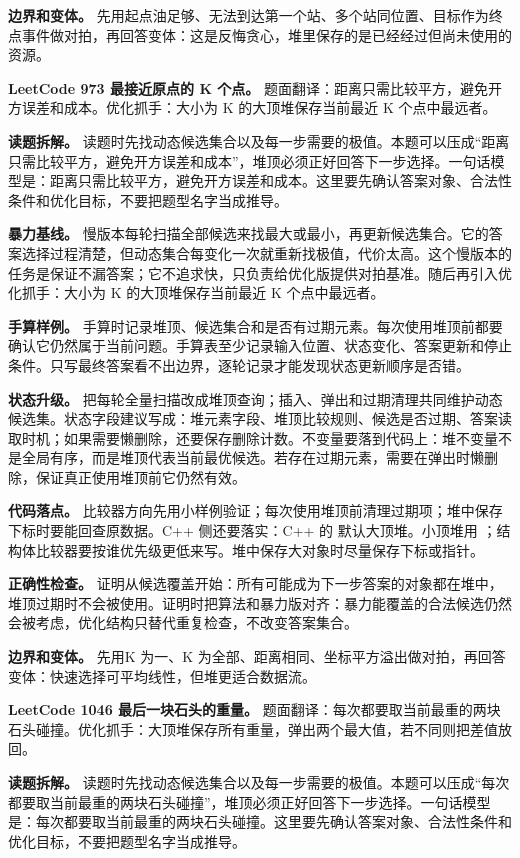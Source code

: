 \textbf{边界和变体。} 先用起点油足够、无法到达第一个站、多个站同位置、目标作为终点事件做对拍，再回答变体：这是反悔贪心，堆里保存的是已经经过但尚未使用的资源。

\noindent\textbf{LeetCode 973 最接近原点的 K 个点。} 题面翻译：距离只需比较平方，避免开方误差和成本。优化抓手：大小为 K 的大顶堆保存当前最近 K 个点中最远者。

\textbf{读题拆解。} 读题时先找动态候选集合以及每一步需要的极值。本题可以压成“距离只需比较平方，避免开方误差和成本”，堆顶必须正好回答下一步选择。一句话模型是：距离只需比较平方，避免开方误差和成本。这里要先确认答案对象、合法性条件和优化目标，不要把题型名字当成推导。

\textbf{暴力基线。} 慢版本每轮扫描全部候选来找最大或最小，再更新候选集合。它的答案选择过程清楚，但动态集合每变化一次就重新找极值，代价太高。这个慢版本的任务是保证不漏答案；它不追求快，只负责给优化版提供对拍基准。随后再引入优化抓手：大小为 K 的大顶堆保存当前最近 K 个点中最远者。

\textbf{手算样例。} 手算时记录堆顶、候选集合和是否有过期元素。每次使用堆顶前都要确认它仍然属于当前问题。手算表至少记录输入位置、状态变化、答案更新和停止条件。只写最终答案看不出边界，逐轮记录才能发现状态更新顺序是否错。

\textbf{状态升级。} 把每轮全量扫描改成堆顶查询；插入、弹出和过期清理共同维护动态候选集。状态字段建议写成：堆元素字段、堆顶比较规则、候选是否过期、答案读取时机；如果需要懒删除，还要保存删除计数。不变量要落到代码上：堆不变量不是全局有序，而是堆顶代表当前最优候选。若存在过期元素，需要在弹出时懒删除，保证真正使用堆顶前它仍然有效。

\textbf{代码落点。} 比较器方向先用小样例验证；每次使用堆顶前清理过期项；堆中保存下标时要能回查原数据。C++ 侧还要落实：C++ 的  默认大顶堆。小顶堆用 ；结构体比较器要按谁优先级更低来写。堆中保存大对象时尽量保存下标或指针。

\textbf{正确性检查。} 证明从候选覆盖开始：所有可能成为下一步答案的对象都在堆中，堆顶过期时不会被使用。证明时把算法和暴力版对齐：暴力能覆盖的合法候选仍然会被考虑，优化结构只替代重复检查，不改变答案集合。

\textbf{边界和变体。} 先用K 为一、K 为全部、距离相同、坐标平方溢出做对拍，再回答变体：快速选择可平均线性，但堆更适合数据流。

\noindent\textbf{LeetCode 1046 最后一块石头的重量。} 题面翻译：每次都要取当前最重的两块石头碰撞。优化抓手：大顶堆保存所有重量，弹出两个最大值，若不同则把差值放回。

\textbf{读题拆解。} 读题时先找动态候选集合以及每一步需要的极值。本题可以压成“每次都要取当前最重的两块石头碰撞”，堆顶必须正好回答下一步选择。一句话模型是：每次都要取当前最重的两块石头碰撞。这里要先确认答案对象、合法性条件和优化目标，不要把题型名字当成推导。

